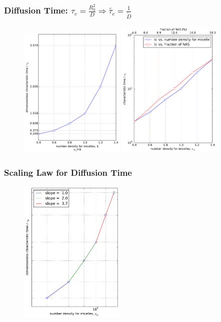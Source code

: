 \documentclass[slidestop, compress, mathserif]{beamer}
\begin{document}
\begin{frame}
  \frametitle{Diffusion Time: $\tau_c = \frac{R_0^2}{D} \Rightarrow \tilde{\tau_c} = \frac{1}{\tilde{D}}$}
  \begin{figure}
    \centering
    \includegraphics[width=0.45\textwidth]{../characteristic_time.pdf}
    \includegraphics[width=0.45\textwidth]{../diffusion_time_semilogy.pdf}
  \end{figure}
\end{frame}
\begin{frame}
  \frametitle{Scaling Law for Diffusion Time}
  \begin{figure}
    \centering
    \includegraphics[width=0.45\textwidth]{../characteristic_time_loglog.pdf}
  \end{figure}
\end{frame}
\end{document}

